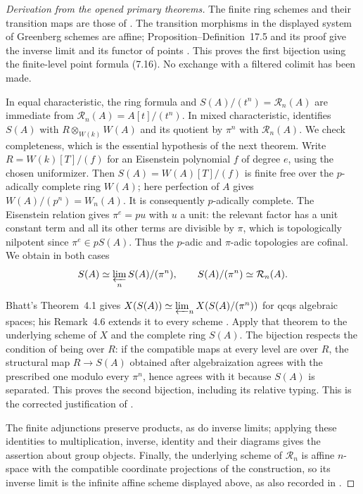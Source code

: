 \begin{proof}[Derivation from the opened primary theorems]
The finite ring schemes and their transition maps are those of
\cite[Sections~4,6--7]{BBertapelleGonzalezAviles2022}.
The transition morphisms in the displayed system of Greenberg schemes
are affine; Proposition--Definition~17.5 and its proof give the inverse
limit and its functor of points
\cite[pp.~93--94; see also (18.1)]{BBertapelleGonzalezAviles2022}.
This proves the first bijection using the finite-level point formula
(7.16).  No exchange with a filtered colimit has been made.

In equal characteristic, the ring formula and
$S(A)/(t^n)=\mathcal R_n(A)$ are immediate from
$\mathcal R_n(A)=A[t]/(t^n)$.  In mixed characteristic,
\cite[Remark~6.6(b), (6.7)]{BBertapelleGonzalezAviles2022}
identifies $S(A)$ with $R\otimes_{W(k)}W(A)$ and its quotient by
$\pi^n$ with $\mathcal R_n(A)$.  We check completeness, which is the
essential hypothesis of the next theorem.  Write
$R=W(k)[T]/(f)$ for an Eisenstein polynomial $f$ of degree $e$,
using the chosen uniformizer.  Then
$S(A)=W(A)[T]/(f)$ is finite free over the $p$-adically complete ring
$W(A)$; here perfection of $A$ gives
$W(A)/(p^n)=W_n(A)$.  It is consequently $p$-adically complete.
The Eisenstein relation gives $\pi^e=p u$ with $u$ a unit:
the relevant factor has a unit constant term and all its other terms
are divisible by $\pi$, which is topologically nilpotent since
$\pi^e\in pS(A)$.  Thus the $p$-adic and $\pi$-adic topologies are
cofinal.  We obtain in both cases
\[
 S(A)\simeq\varprojlim_n S(A)/(\pi^n),
 \qquad S(A)/(\pi^n)\simeq\mathcal R_n(A).
\]

Bhatt's Theorem~4.1 gives
$X(S(A))\simeq\varprojlim_n X(S(A)/(\pi^n))$ for qcqs algebraic
spaces; his Remark~4.6 extends it to every scheme
\cite[Section~4, pp.~16--17]{ROOT_BhattAlgebraization2014}.
Apply that theorem to the underlying scheme of $X$ and the complete
ring $S(A)$.  The bijection respects the condition of being over $R$:
if the compatible maps at every level are over $R$, the structural map
$R\to S(A)$ obtained after algebraization agrees with the prescribed
one modulo every $\pi^n$, hence agrees with it because $S(A)$ is
separated.  This proves the second bijection, including its relative
typing.  This is the corrected justification of
\cite[Proposition~18.2]{BBertapelleGonzalezAviles2022}.

The finite adjunctions preserve products, as do inverse limits; applying
these identities to multiplication, inverse, identity and their diagrams
gives the assertion about group objects.  Finally, the underlying scheme
of $\mathcal R_n$ is affine $n$-space with the compatible coordinate
projections of the construction, so its inverse limit is the infinite
affine scheme displayed above, as also recorded in
\cite[Section~6 and the paragraph after (18.1)]{BBertapelleGonzalezAviles2022}.
\end{proof}
